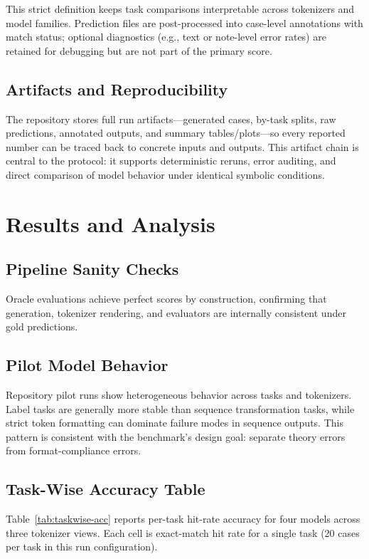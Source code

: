 \documentclass{article}
\begin{document}
This strict definition keeps task comparisons interpretable across tokenizers and model families. Prediction files are post-processed into case-level annotations with match status; optional diagnostics (e.g., text or note-level error rates) are retained for debugging but are not part of the primary score.

\subsection{Artifacts and Reproducibility}

The repository stores full run artifacts---generated cases, by-task splits, raw predictions, annotated outputs, and summary tables/plots---so every reported number can be traced back to concrete inputs and outputs. This artifact chain is central to the protocol: it supports deterministic reruns, error auditing, and direct comparison of model behavior under identical symbolic conditions.

\section{Results and Analysis}
\label{sec:results}

\subsection{Pipeline Sanity Checks}

Oracle evaluations achieve perfect scores by construction, confirming that generation, tokenizer rendering, and evaluators are internally consistent under gold predictions.

\subsection{Pilot Model Behavior}

Repository pilot runs show heterogeneous behavior across tasks and tokenizers. Label tasks are generally more stable than sequence transformation tasks, while strict token formatting can dominate failure modes in sequence outputs. This pattern is consistent with the benchmark's design goal: separate theory errors from format-compliance errors.

\subsection{Task-Wise Accuracy Table}

Table~\ref{tab:taskwise-acc} reports per-task hit-rate accuracy for four models across three tokenizer views. Each cell is exact-match hit rate for a single task (20 cases per task in this run configuration).
\end{document}
